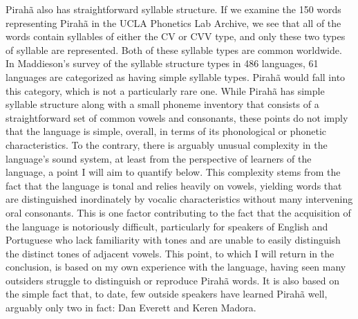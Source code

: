 \documentclass[output=paper,colorlinks,citecolor=brown
]{langscibook}
\begin{document}
    Pirahã also has straightforward syllable structure. If we examine the 150 words representing Pirahã in the UCLA Phonetics Lab Archive, we see that all of the words contain syllables of either the CV or CVV type, and only these two types of syllable are represented. Both of these syllable types are common worldwide. In Maddieson’s survey of the syllable structure types in 486 languages, 61 languages are categorized as having simple syllable types.\cite{wals12} Pirahã would fall into this category, which is not a particularly rare one. While Pirahã has simple syllable structure along with a small phoneme inventory that consists of a straightforward set of common vowels and consonants, these points do not imply that the language is simple, overall, in terms of its phonological or phonetic characteristics. To the contrary, there is arguably unusual complexity in the language’s sound system, at least from the perspective of learners of the language, a point I will aim to quantify below. This complexity stems from the fact that the language is tonal and relies heavily on vowels, yielding words that are distinguished inordinately by vocalic characteristics without many intervening oral consonants. This is one factor contributing to the fact that the acquisition of the language is notoriously difficult, particularly for speakers of English and Portuguese who lack familiarity with tones and are unable to easily distinguish the distinct tones of adjacent vowels. This point, to which I will return in the conclusion, is based on my own experience with the language, having seen many outsiders struggle to distinguish or reproduce Pirahã words. It is also based on the simple fact that, to date, few outside speakers have learned Pirahã well, arguably only two in fact: Dan Everett and Keren Madora.  
    
\end{document}
